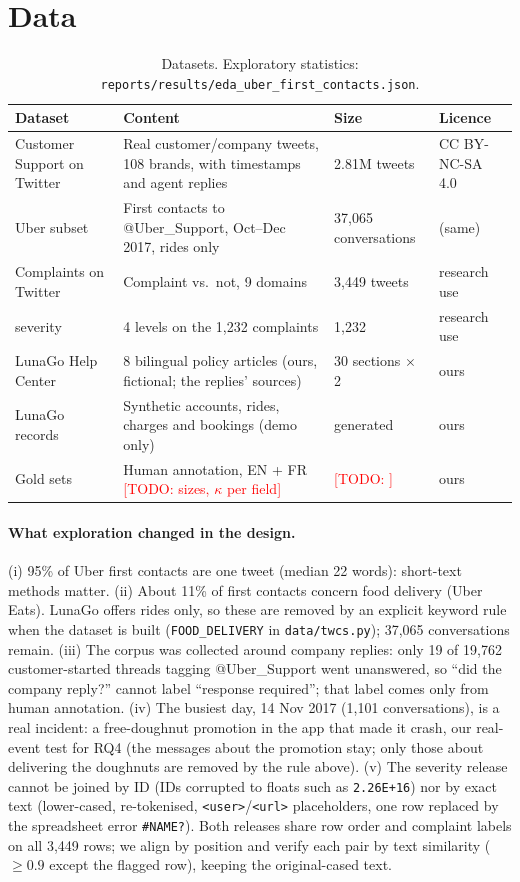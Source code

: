 \documentclass[11pt,a4paper]{article}
\newcommand{\todo}[1]{\textcolor{red}{[TODO: #1]}}
\newcommand{\res}[1]{\texttt{\small reports/results/#1}}
\begin{document}
\section{Data}
\label{sec:data}
\begin{table}[h]
\centering\small
\begin{tabularx}{\linewidth}{lXll}
\toprule
Dataset & Content & Size & Licence \\
\midrule
Customer Support on Twitter & Real customer/company tweets, 108 brands, with timestamps and agent replies & 2.81M tweets & CC BY-NC-SA 4.0 \\
\quad Uber subset & First contacts to @Uber\_Support, Oct--Dec 2017, rides only & 37{,}065 conversations & (same) \\
Complaints on Twitter & Complaint vs.\ not, 9 domains \citep{preotiuc2019complaints} & 3{,}449 tweets & research use \\
\quad severity & 4 levels on the 1{,}232 complaints \citep{jin2021severity} & 1{,}232 & research use \\
LunaGo Help Center & 8 bilingual policy articles (ours, fictional; the replies' sources) & 30 sections $\times$ 2 & ours \\
LunaGo records & Synthetic accounts, rides, charges and bookings (demo only) & generated & ours \\
Gold sets & Human annotation, EN + FR \todo{sizes, $\kappa$ per field} & \todo{} & ours \\
\bottomrule
\end{tabularx}
\caption{Datasets. Exploratory statistics: \res{eda\_uber\_first\_contacts.json}.}
\end{table}

\paragraph{What exploration changed in the design.}
(i) 95\% of Uber first contacts are one tweet (median 22 words): short-text methods matter.
(ii) About 11\% of first contacts concern food delivery (Uber Eats). LunaGo offers rides only, so
these are removed by an explicit keyword rule when the dataset is built (\texttt{FOOD\_DELIVERY} in
\texttt{data/twcs.py}); 37{,}065 conversations remain.
(iii) The corpus was collected around company replies: only 19 of 19{,}762 customer-started threads
tagging @Uber\_Support went unanswered, so ``did the company reply?'' cannot label ``response
required''; that label comes only from human annotation.
(iv) The busiest day, 14 Nov 2017 (1{,}101 conversations), is a real incident: a free-doughnut
promotion in the app that made it crash, our real-event test for RQ4 (the messages about the
promotion stay; only those about delivering the doughnuts are removed by the rule above).
(v) The severity release cannot be joined by ID (IDs corrupted to floats such as \texttt{2.26E+16})
nor by exact text (lower-cased, re-tokenised, \texttt{<user>}/\texttt{<url>} placeholders, one row
replaced by the spreadsheet error \texttt{\#NAME?}). Both releases share row order and complaint
labels on all 3{,}449 rows; we align by position and verify each pair by text similarity
($\geq 0.9$ except the flagged row), keeping the original-cased text.
\end{document}
